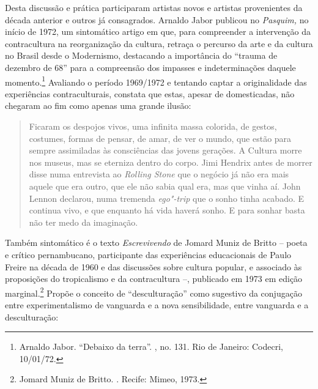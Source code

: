 Desta discussão e prática participaram artistas novos e artistas
provenientes da década anterior e outros já consagrados. Arnaldo Jabor
publicou no \emph{Pasquim,} no início de 1972, um sintomático artigo em
que, para compreender a intervenção da contracultura na reorganização da
cultura, retraça o percurso da arte e da cultura no Brasil desde o
Modernismo, destacando a importância do ``trauma de dezembro de 68''
para a compreensão dos impasses e indeterminações daquele
momento.\footnote{Arnaldo Jabor. ``Debaixo da terra''. {},
  no. 131. Rio de Janeiro: Codecri, 10/01/72.} Avaliando o período
1969/1972 e tentando captar a originalidade das experiências
contraculturais, constata que estas, apesar de domesticadas, não
chegaram ao fim como apenas uma grande ilusão:

\begin{quote}
Ficaram os despojos vivos, uma infinita massa colorida, de gestos,
costumes, formas de pensar, de amar, de ver o mundo, que estão para
sempre assimiladas às consciências das jovens gerações. A Cultura morre
nos museus, mas se eterniza dentro do corpo. Jimi Hendrix antes de
morrer disse numa entrevista ao \emph{Rolling Stone} que o negócio já
não era mais aquele que era outro, que ele não sabia qual era, mas que
vinha aí. John Lennon declarou, numa tremenda \emph{ego"-trip} que o
sonho tinha acabado. E continua vivo, e que enquanto há vida haverá
sonho. E para sonhar basta não ter medo da imaginação.
\end{quote}

Também sintomático é o texto \emph{Escrevivendo} de Jomard Muniz de
Britto -- poeta e crítico pernambucano, participante das experiências
educacionais de Paulo Freire na década de 1960 e das discussões sobre
cultura popular, e associado às proposições do tropicalismo e da
contracultura --, publicado em 1973 em edição marginal.\footnote{Jomard
  Muniz de Britto. {}. Recife: Mimeo, 1973.} Propõe o
conceito de ``desculturação'' como sugestivo da conjugação entre
experimentalismo de vanguarda e a nova sensibilidade, entre vanguarda e
a desculturação:

